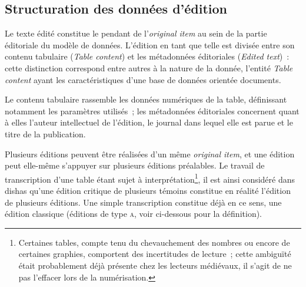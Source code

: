 \documentclass[a4paper,12pt,twoside]{book}
\newcommand{\eng}{\emph}
\newcommand{\oi}{\eng{original item}\xspace}
\newcommand{\dishas}{\gls{dishas}\xspace}
\begin{document}
		\subsection{Structuration des données d'édition}
Le texte édité constitue le pendant de l'\oi au sein de la partie éditoriale du modèle de données. L'édition en tant que telle est divisée entre son contenu tabulaire (\eng{Table content}) et les métadonnées éditoriales (\eng{Edited text})~: cette distinction correspond entre autres à la nature de la donnée, l'entité \eng{Table content} ayant les caractéristiques d'une base de données orientée documents.

Le contenu tabulaire rassemble les données numériques de la table, définissant notamment les paramètres utilisés~; les métadonnées éditoriales concernent quant à elles l'auteur intellectuel de l'édition, le journal dans lequel elle est parue et le titre de la publication.

Plusieurs éditions peuvent être réalisées d'un même \oi, et une édition peut elle-même s'appuyer sur plusieurs éditions préalables. Le travail de transcription d'une table étant sujet à interprétation\footnote{Certaines tables, compte tenu du chevauchement des nombres ou encore de certaines graphies, comportent des incertitudes de lecture~; cette ambiguïté était probablement déjà présente chez les lecteurs médiévaux, il s'agit de ne pas l'effacer lors de la numérisation.}, il est ainsi considéré dans \dishas qu'une édition critique de plusieurs témoins constitue en réalité l'édition de plusieurs éditions. Une simple transcription constitue déjà en ce sens, une édition classique (éditions de type \textsc{a}, voir ci-dessous pour la définition).
\end{document}
